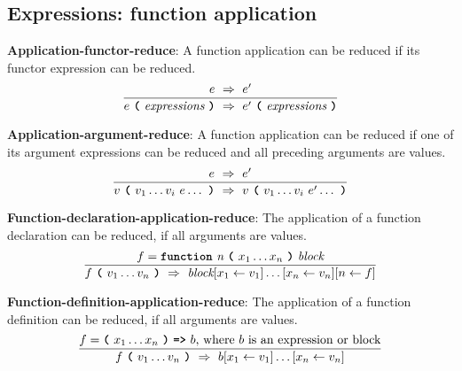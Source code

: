 \subsection*{Expressions: function application}

\textbf{Application-functor-reduce}: A function application
can be reduced if its functor expression can be reduced.
\[
\frac{
  e \ \Rightarrow \ e'
}{
  e\  \textbf{\texttt{(}}\ \textit{expressions} \ \textbf{\texttt{)}}
  \ \Rightarrow \ 
  e'\  \textbf{\texttt{(}}\ \textit{expressions} \ \textbf{\texttt{)}}
}
\]


\vspace{10mm}
\textbf{Application-argument-reduce}: A function application
can be reduced if one of its argument expressions can be reduced and all
preceding arguments are values.
\[
\frac{
  e \ \Rightarrow \ e'
}{
  v\  \textbf{\texttt{(}}\ v_1 \ldots v_i \ e \ldots\ \textbf{\texttt{)}}
  \ \Rightarrow \ 
  v\  \textbf{\texttt{(}}\ v_1 \ldots v_i \ e' \ldots\ \textbf{\texttt{)}}
}
\]



\vspace{10mm}
\textbf{Function-declaration-application-reduce}:
The application of a function declaration
can be reduced, if all
arguments are values. 
\[
\frac{
  f = \textbf{\texttt{function}}\  \textit{n} \ 
                 \textbf{\texttt{(}}\  x_1 \ldots x_n
                 \ \textbf{\texttt{)}}\ \textit{block}
}{
  f\ \textbf{\texttt{(}}\ v_1 \ldots v_n\ \textbf{\texttt{)}}
  \ \Rightarrow \ 
  \textit{block} [x_1 \leftarrow v_1]\ldots[x_n \leftarrow v_n]
  [n \leftarrow f]
}
\]

\vspace{10mm}
\textbf{Function-definition-application-reduce}:
The application of a function definition
can be reduced, if all
arguments are values. 
\[
\frac{
  f = \textbf{\texttt{(}}\  x_1 \ldots x_n
                 \ \textbf{\texttt{)}}\ \textbf{\texttt{=>}}\ b
                   \mbox{, where $b$ is an expression or block}
}{
  f\ \textbf{\texttt{(}}\ v_1 \ldots v_n\ \textbf{\texttt{)}}
  \ \Rightarrow \ 
  b [x_1 \leftarrow v_1]\ldots[x_n \leftarrow v_n]
}
\]






    
